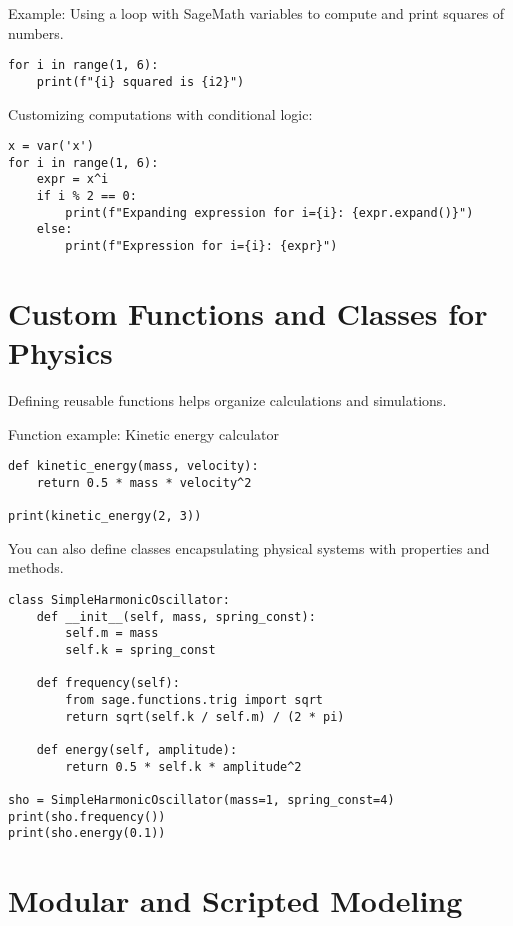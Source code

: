 \documentclass[12pt]{book}
\begin{document}
Example: Using a loop with SageMath variables to compute and print squares of numbers.

\begin{verbatim}
for i in range(1, 6):
    print(f"{i} squared is {i2}")
\end{verbatim}

Customizing computations with conditional logic:

\begin{verbatim}
x = var('x')
for i in range(1, 6):
    expr = x^i
    if i % 2 == 0:
        print(f"Expanding expression for i={i}: {expr.expand()}")
    else:
        print(f"Expression for i={i}: {expr}")
\end{verbatim}

\section{Custom Functions and Classes for Physics}

Defining reusable functions helps organize calculations and simulations.

Function example: Kinetic energy calculator

\begin{verbatim}
def kinetic_energy(mass, velocity):
    return 0.5 * mass * velocity^2

print(kinetic_energy(2, 3))
\end{verbatim}

You can also define classes encapsulating physical systems with properties and methods.

\begin{verbatim}
class SimpleHarmonicOscillator:
    def __init__(self, mass, spring_const):
        self.m = mass
        self.k = spring_const
        
    def frequency(self):
        from sage.functions.trig import sqrt
        return sqrt(self.k / self.m) / (2 * pi)
        
    def energy(self, amplitude):
        return 0.5 * self.k * amplitude^2

sho = SimpleHarmonicOscillator(mass=1, spring_const=4)
print(sho.frequency())
print(sho.energy(0.1))
\end{verbatim}

\section{Modular and Scripted Modeling}
\end{document}
